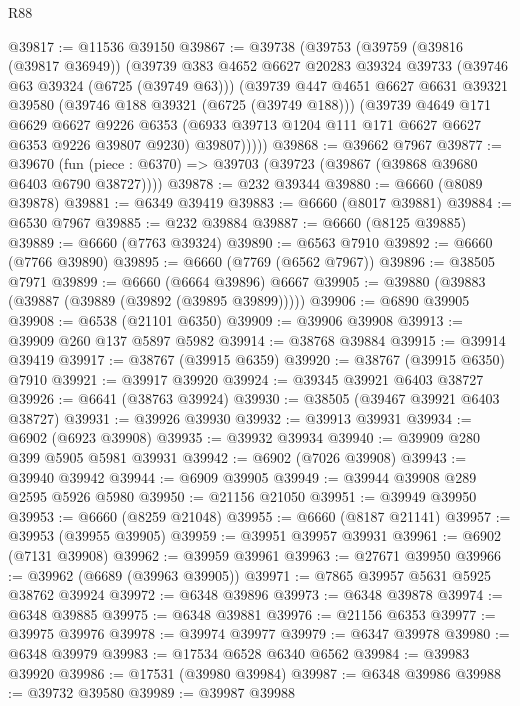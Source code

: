 \begin{lexlean}{R88}
\begin{coremodule}
@39817 := @11536 @39150
@39867 := @39738
    (@39753
      (@39759
        (@39816 (@39817 @36949))
        (@39739
          @383
          @4652
          @6627
          @20283
          @39324
          @39733
          (@39746 @63 @39324 (@6725 (@39749 @63)))
          (@39739
            @447
            @4651
            @6627
            @6631
            @39321
            @39580
            (@39746 @188 @39321 (@6725 (@39749 @188)))
            (@39739
              @4649
              @171
              @6629
              @6627
              @9226
              @6353
              (@6933 @39713 @1204 @111 @171 @6627 @6627 @6353 @9226 @39807 @9230)
              @39807)))))
@39868 := @39662 @7967
@39877 := @39670
    (fun (piece : @6370) => @39703 (@39723 (@39867 (@39868 @39680 @6403 @6790 @38727))))
@39878 := @232 @39344
@39880 := @6660 (@8089 @39878)
@39881 := @6349 @39419
@39883 := @6660 (@8017 @39881)
@39884 := @6530 @7967
@39885 := @232 @39884
@39887 := @6660 (@8125 @39885)
@39889 := @6660 (@7763 @39324)
@39890 := @6563 @7910
@39892 := @6660 (@7766 @39890)
@39895 := @6660 (@7769 (@6562 @7967))
@39896 := @38505 @7971
@39899 := @6660 (@6664 @39896) @6667
@39905 := @39880 (@39883 (@39887 (@39889 (@39892 (@39895 @39899)))))
@39906 := @6890 @39905
@39908 := @6538 (@21101 @6350)
@39909 := @39906 @39908
@39913 := @39909 @260 @137 @5897 @5982
@39914 := @38768 @39884
@39915 := @39914 @39419
@39917 := @38767 (@39915 @6359)
@39920 := @38767 (@39915 @6350) @7910
@39921 := @39917 @39920
@39924 := @39345 @39921 @6403 @38727
@39926 := @6641 (@38763 @39924)
@39930 := @38505 (@39467 @39921 @6403 @38727)
@39931 := @39926 @39930
@39932 := @39913 @39931
@39934 := @6902 (@6923 @39908)
@39935 := @39932 @39934
@39940 := @39909 @280 @399 @5905 @5981 @39931
@39942 := @6902 (@7026 @39908)
@39943 := @39940 @39942
@39944 := @6909 @39905
@39949 := @39944 @39908 @289 @2595 @5926 @5980
@39950 := @21156 @21050
@39951 := @39949 @39950
@39953 := @6660 (@8259 @21048)
@39955 := @6660 (@8187 @21141)
@39957 := @39953 (@39955 @39905)
@39959 := @39951 @39957 @39931
@39961 := @6902 (@7131 @39908)
@39962 := @39959 @39961
@39963 := @27671 @39950
@39966 := @39962 (@6689 (@39963 @39905))
@39971 := @7865 @39957 @5631 @5925 @38762 @39924
@39972 := @6348 @39896
@39973 := @6348 @39878
@39974 := @6348 @39885
@39975 := @6348 @39881
@39976 := @21156 @6353
@39977 := @39975 @39976
@39978 := @39974 @39977
@39979 := @6347 @39978
@39980 := @6348 @39979
@39983 := @17534 @6528 @6340 @6562
@39984 := @39983 @39920
@39986 := @17531 (@39980 @39984)
@39987 := @6348 @39986
@39988 := @39732 @39580
@39989 := @39987 @39988

\end{coremodule}
\end{lexlean}
